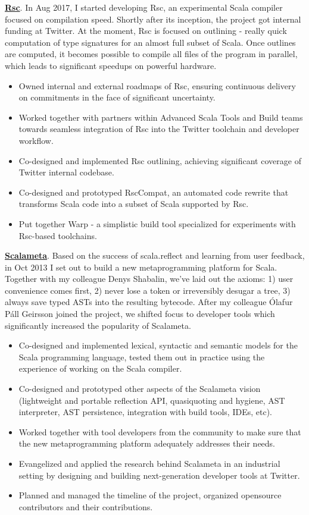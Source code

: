 \documentclass[margin, 10pt]{Stylesheet}
\begin{document}
\begin{resume}
\textbf{\href{https://github.com/twitter/rsc}{Rsc}}. In Aug 2017, I started developing Rsc,
an experimental Scala compiler focused on compilation speed. Shortly after its inception,
the project got internal funding at Twitter. At the moment, Rsc is focused on outlining - really
quick computation of type signatures for an almost full subset of Scala. Once outlines are computed,
it becomes possible to compile all files of the program in parallel, which leads to significant
speedups on powerful hardware.

\begin{itemize} \itemsep -2pt
\item Owned internal and external roadmaps of Rsc, ensuring continuous delivery
on commitments in the face of significant uncertainty.
\item Worked together with partners within Advanced Scala Tools and Build teams towards
seamless integration of Rsc into the Twitter toolchain and developer workflow.
\item Co-designed and implemented Rsc outlining, achieving significant coverage of Twitter internal
codebase.
\item Co-designed and prototyped RscCompat, an automated code rewrite that transforms Scala code
into a subset of Scala supported by Rsc.
\item Put together Warp - a simplistic build tool specialized for experiments with Rsc-based
toolchains.
\end{itemize}

\textbf{\href{http://scalameta.org/}{Scalameta}}. Based on the success of scala.reflect and
learning from user feedback, in Oct 2013 I set out to build a new metaprogramming platform for
Scala. Together with my colleague Denys Shabalin, we've laid out the axioms: 1) user convenience
comes first, 2) never lose a token or irreversibly desugar a tree, 3) always save typed ASTs into
the resulting bytecode. After my colleague \'{O}lafur P\'{a}ll Geirsson joined the project, we
shifted focus to developer tools which significantly increased the popularity of Scalameta.

\begin{itemize} \itemsep -2pt
\item Co-designed and implemented lexical, syntactic and semantic models for the Scala programming
language, tested them out in practice using the experience of working on the Scala compiler.
\item Co-designed and prototyped other aspects of the Scalameta vision (lightweight and portable
reflection API, quasiquoting and hygiene, AST interpreter, AST persistence, integration with build
tools, IDEs, etc).
\item Worked together with tool developers from the community to make sure that the new
metaprogramming platform adequately addresses their needs.
\item Evangelized and applied the research behind Scalameta in an industrial setting by designing
and building next-generation developer tools at Twitter.
\item Planned and managed the timeline of the project, organized opensource contributors
and their contributions.
\end{itemize}


\end{resume}
\end{document}
